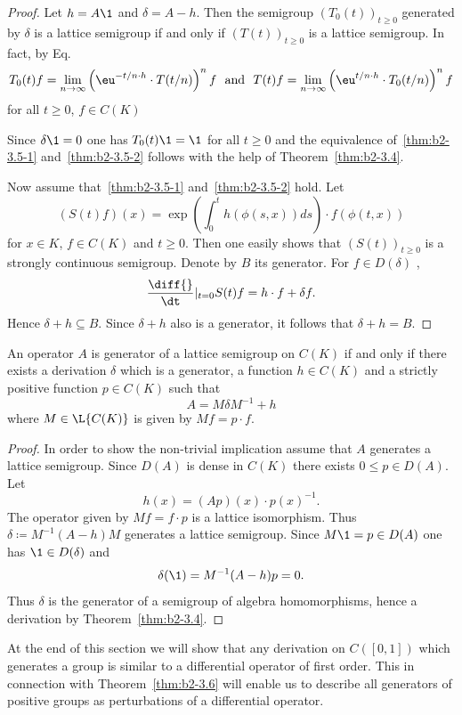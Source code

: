 \begin{proof}
Let $h = A\1$ and $\delta = A - h$.
Then the semigroup $(T_{0}(t))_{t \geq 0}$ generated by $\delta$ is a lattice semigroup if and only if\/ $(T(t))_{t \geq 0}$ is a lattice semigroup. In fact, by 
Eq.~ %
\[
T_{0}(t)f = \lim_{n \to \infty} \left(\eu^{-t/n \cdot h} \cdot T(t/n)\right)^{n}f 
\ \text{ and }\  
 T(t)f = \lim_{n \to \infty} \left(\eu^{{t/n} \cdot h} \cdot T_{0}(t/n)\right)^{n}f
\]
 for all $t \geq 0$, $f \in C(K)$

Since $\delta \1 = 0$ one has $T_{0}(t)\1 = \1$ for all $t \geq 0$ and the equivalence of~\ref{thm:b2-3.5-1} and~\ref{thm:b2-3.5-2} follows with the help of Theorem~\ref{thm:b2-3.4}.

Now assume that~\ref{thm:b2-3.5-1} and~\ref{thm:b2-3.5-2} hold.
Let
\[
(S(t)f) (x) = \exp\left( \int_{0}^{t} h(\phi(s,x))ds \right) \cdot f(\phi(t,x))
\]
for $x \in K$, $f \in C (K)$ and $t \geq 0$. 
Then one easily shows that $(S(t))_{t\geq 0}$ is a strongly con\-tinu\-ous semigroup.
Denote by $B$ its generator.
For $f \in D(\delta)$ , 
%
\[
	 \frac{\diff{}}{\dt}|_{t = 0}S(t)f = h \cdot f + \delta f .
\]
%
Hence $\delta + h \subseteq B$.  
Since $\delta + h$ also is a generator, it follows that $\delta + h = B$.
\end{proof}%
\begin{theorem}\label{thm:b2-3.6}
An operator $A$ is generator of a lattice semigroup on $C(K)$ if and only if there exists a derivation $\delta$ which is a generator, a function $h \in C(K)$ and a strictly positive function $p \in C(K)$ such that
\begin{equation} \label{eq:b2-3.7}
A = M\delta M^{-1} + h
\end{equation}
where $M \in \L{C(K)}$ is given by $Mf = p \cdot f$.
\end{theorem}
\begin{proof}
In order to show the non-trivial implication assume that $A$ generates a lattice semigroup.
Since $D(A)$ is dense in $C(K)$ there exists $0 \leq  p \in D(A)$.
Let 
%
\[
	h(x) = (Ap)(x) \cdot p(x)^{-1}.
\]
%
The operator given by $Mf = f \cdot p$ is a lattice isomorphism.
Thus $\delta \coloneq M^{-1}(A - h)M$ generates a lattice semigroup.
Since $M\1 = p \in D(A)$ one has $\1 \in D(\delta)$ and %
\[
	\delta(\1) = M^{-1}(A - h)p = 0.
\]
%
Thus $\delta$ is the generator of a semigroup of algebra homomorphisms, hence a derivation by Theorem~\ref{thm:b2-3.4}.
\end{proof}
At the end of this section we will show that any derivation on $C([0,1])$ which generates a group is similar to a differential operator of first order.
This in connection with Theorem~\ref{thm:b2-3.6} will enable us to describe all generators of positive groups as perturbations of a differential operator.

